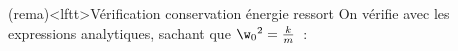 \documentclass[../../main/main.tex]{subfiles}
\begin{document}
\begin{tcb}[label=rema](rema)<lftt>{Vérification conservation énergie ressort}
	On vérifie avec les expressions analytiques, sachant que
	$\w_0{}^2 = \frac{k}{m}$~:
\end{tcb}
\end{document}
